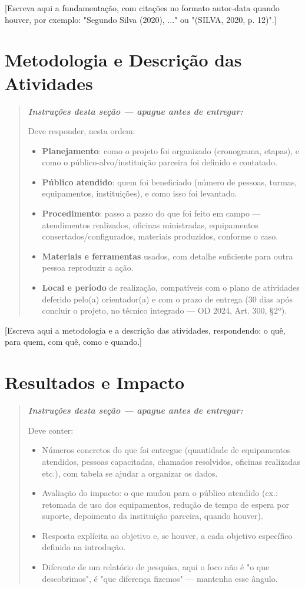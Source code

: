 \documentclass[article,12pt,a4paper]{abntex2}
\newenvironment{instrucoes}{%
  \begin{quotation}\footnotesize\itshape
  \noindent\textbf{\upshape Instruções desta seção — apague antes de entregar:}\par\smallskip
}{%
  \end{quotation}
}
\begin{document}
[Escreva aqui a fundamentação, com citações no formato autor-data quando houver, por
exemplo: "Segundo Silva (2020), ..." ou "(SILVA, 2020, p. 12)".]

\section{Metodologia e Descrição das Atividades}

\begin{instrucoes}
Deve responder, nesta ordem:
\begin{itemize}
  \item \textbf{Planejamento}: como o projeto foi organizado (cronograma, etapas), e como o público-alvo/instituição parceira foi definido e contatado.
  \item \textbf{Público atendido}: quem foi beneficiado (número de pessoas, turmas, equipamentos, instituições), e como isso foi levantado.
  \item \textbf{Procedimento}: passo a passo do que foi feito em campo — atendimentos realizados, oficinas ministradas, equipamentos consertados/configurados, materiais produzidos, conforme o caso.
  \item \textbf{Materiais e ferramentas} usados, com detalhe suficiente para outra pessoa reproduzir a ação.
  \item \textbf{Local e período} de realização, compatíveis com o plano de atividades deferido pelo(a) orientador(a) e com o prazo de entrega (30 dias após concluir o projeto, no técnico integrado — OD 2024, Art. 300, §2º).
\end{itemize}
\end{instrucoes}

[Escreva aqui a metodologia e a descrição das atividades, respondendo: o quê, para quem, com quê, como e quando.]

\section{Resultados e Impacto}

\begin{instrucoes}
Deve conter:
\begin{itemize}
  \item Números concretos do que foi entregue (quantidade de equipamentos atendidos, pessoas capacitadas, chamados resolvidos, oficinas realizadas etc.), com tabela se ajudar a organizar os dados.
  \item Avaliação do impacto: o que mudou para o público atendido (ex.: retomada de uso dos equipamentos, redução de tempo de espera por suporte, depoimento da instituição parceira, quando houver).
  \item Resposta explícita ao objetivo e, se houver, a cada objetivo específico definido na introdução.
  \item Diferente de um relatório de pesquisa, aqui o foco não é "o que descobrimos", é "que diferença fizemos" — mantenha esse ângulo.
\end{itemize}
\end{instrucoes}
\end{document}
